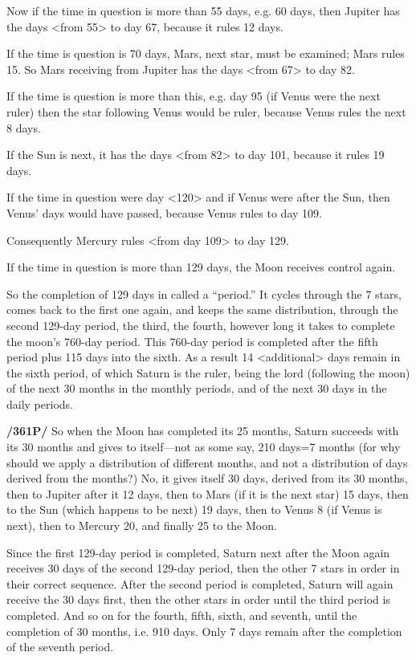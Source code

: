 Now if the time in question is more than 55 days, e.g. 60 days, then Jupiter has the days <from 55> to day 67, because it rules 12 days. 

If the time is question is 70 days, Mars, next star, must be examined; Mars rules 15. So Mars receiving from Jupiter has the days <from 67> to day 82. 

If the time is question is more than this, e.g. day 95 (if Venus were the next ruler) then the star following Venus would be ruler, because Venus rules the next 8 days. 

If the Sun is next, it has the days <from 82> to day 101, because it rules 19 days. 

If the time in question were day <120> and if Venus were after the Sun, then Venus’ days would have passed, because Venus rules to day 109.

Consequently Mercury rules <from day 109> to day 129. 

If the time in question is more than 129 days, the Moon receives control again.

So the completion of 129 days in called a “period.” It cycles through the 7 stars, comes back to the first one again, and keeps the same distribution, through the second 129-day period, the third, the fourth,
however long it takes to complete the moon’s 760-day period. This 760-day period is completed after the fifth period plus 115 days into the sixth. As a result 14 <additional> days remain in the sixth period, of which Saturn is the ruler, being the lord (following the moon) of the next 30 months in the monthly periods, and of the next 30 days in the daily periods. 

\textbf{/361P/} So when the Moon has completed its 25 months, Saturn succeeds with its 30 months and gives to itself—not as some say, 210 days=7 months (for why should we apply a distribution of different months, and not a distribution of days derived from the
months?) No, it gives itself 30 days, derived from its 30 months, then to Jupiter after it 12 days, then to Mars (if it is the next star) 15 days, then to the Sun (which happens to be next) 19 days, then to Venus 8 (if Venus is next), then to Mercury 20, and finally 25 to the Moon.

Since the first 129-day period is completed, Saturn next after the Moon again receives 30 days of the second 129-day period, then the other 7 stars in order in their correct sequence. After the second period is completed, Saturn will again receive the 30 days first, then the other stars in order until the third period is completed. And so on for the fourth, fifth, sixth, and seventh, until the completion of 30 months, i.e. 910 days. Only 7 days remain after the completion of the seventh period.

